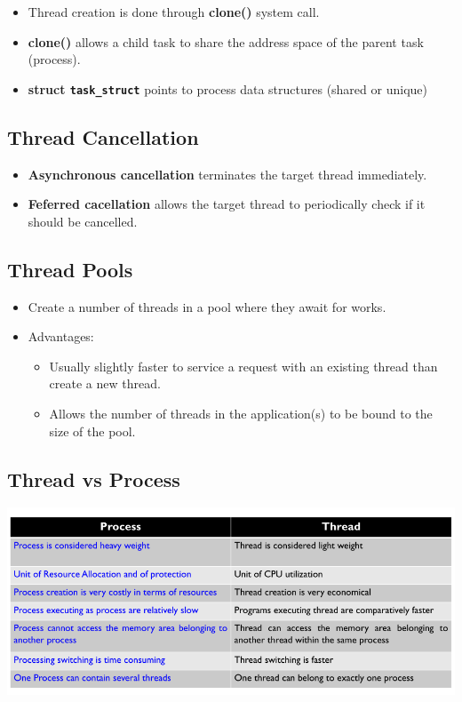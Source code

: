 \documentclass[10pt]{article}
\newcommand{\tf}{\textbf}
\newcommand{\ttt}{\texttt}
\begin{document}
\begin{itemize}
	\item Thread creation is done through \tf{clone()} system call.
	\item \tf{clone()} allows a child task to share the address space of the parent task (process).
	\item \tf{struct \ttt{task\_struct}} points to process data structures (shared or unique)
\end{itemize}

\subsection{Thread Cancellation}

\begin{itemize}
	\item \tf{Asynchronous cancellation} terminates the target thread immediately.
	\item \tf{Feferred cacellation} allows the target thread to periodically check if it should be cancelled.
\end{itemize}

\subsection{Thread Pools}

\begin{itemize}
	\item Create a number of threads in a pool where they await for works.
	\item Advantages:
	\begin{itemize}
		\item Usually slightly faster to service a request with an existing thread than create a new thread.
		\item Allows the number of threads in the application(s) to be bound to the size of the pool. 
	\end{itemize}
\end{itemize}

\subsection{Thread vs Process}

\bigbreak
\includegraphics[scale = 0.7]{ThreadvsProcess.png}
\bigbreak
\end{document}
